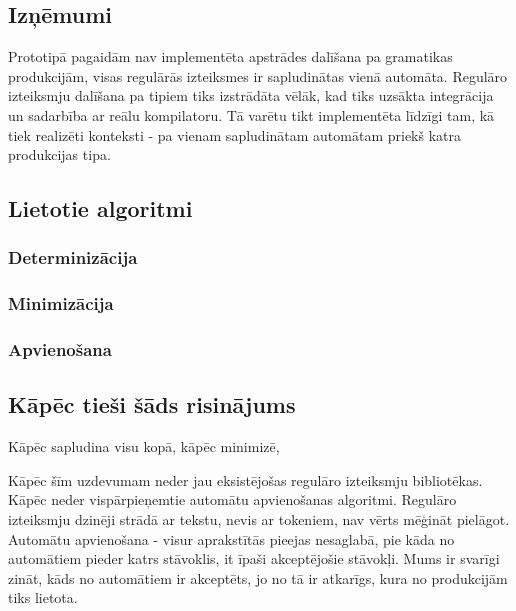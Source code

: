 \subsection{Izņēmumi}
Prototipā pagaidām nav implementēta apstrādes dalīšana pa gramatikas produkcijām, visas regulārās izteiksmes ir sapludinātas vienā automāta. Regulāro izteiksmju dalīšana pa tipiem tiks izstrādāta vēlāk, kad tiks uzsākta integrācija un sadarbība ar reālu kompilatoru. Tā varētu tikt implementēta līdzīgi tam, kā tiek realizēti konteksti - pa vienam sapludinātam automātam priekš katra produkcijas tipa.

\subsection{Lietotie algoritmi}
\label{subsec:solution_algorithms}

\subsubsection{Determinizācija}

\subsubsection{Minimizācija}

\subsubsection{Apvienošana}

\subsection{Kāpēc tieši šāds risinājums}
\label{subsec:solution_motivation}

Kāpēc sapludina visu kopā, kāpēc minimizē, 


Kāpēc šīm uzdevumam neder jau eksistējošas regulāro izteiksmju bibliotēkas. Kāpēc  neder vispārpieņemtie automātu apvienošanas algoritmi.
Regulāro izteiksmju dzinēji strādā ar tekstu, nevis ar tokeniem, nav vērts mēģināt pielāgot. Automātu apvienošana - visur aprakstītās pieejas nesaglabā, pie kāda no automātiem pieder katrs stāvoklis, it īpaši akceptējošie stāvokļi. Mums ir svarīgi zināt, kāds no automātiem ir akceptēts, jo no tā ir atkarīgs, kura no produkcijām tiks lietota. 



